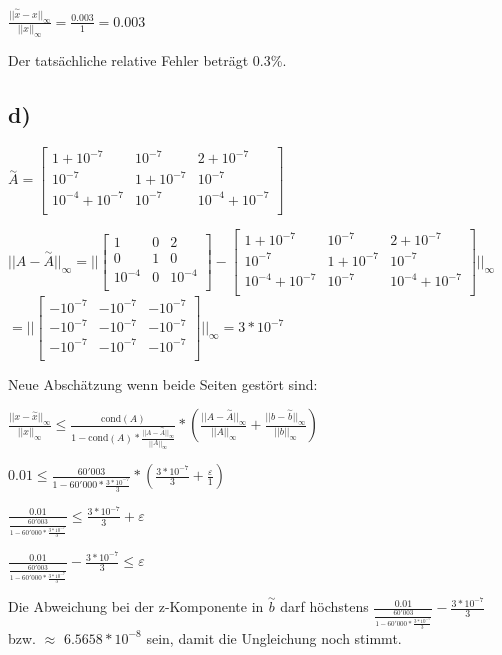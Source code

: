 \documentclass{article}
\begin{document}
\(\frac{||\overset{\sim}{x} - x||_\infty}{||x||_\infty} = \frac{0.003}{1} = 0.003\)

Der tatsächliche relative Fehler beträgt 0.3\%.

\subsection*{d)}

\(\overset{\sim}{A} = 
\begin{bmatrix} 
1 + 10^{-7} & 10^{-7} & 2 + 10^{-7} \\
10^{-7} & 1 + 10^{-7} & 10^{-7} \\
10^{-4} + 10^{-7} & 10^{-7} & 10^{-4} + 10^{-7} \\
\end{bmatrix}
\)

\(||A - \overset{\sim}{A}||_\infty = || 
\begin{bmatrix} 
1 & 0 & 2 \\
0 & 1 & 0 \\
10^{-4} & 0 & 10^{-4} \\
\end{bmatrix}
-
\begin{bmatrix} 
1 + 10^{-7} & 10^{-7} & 2 + 10^{-7} \\
10^{-7} & 1 + 10^{-7} & 10^{-7} \\
10^{-4} + 10^{-7} & 10^{-7} & 10^{-4} + 10^{-7} \\
\end{bmatrix}
||_\infty\)\\
\(
 =
||
\begin{bmatrix} 
-10^{-7} & -10^{-7} & -10^{-7} \\
-10^{-7} & -10^{-7} & -10^{-7} \\
-10^{-7} & -10^{-7} & -10^{-7} \\
\end{bmatrix}
||_\infty = 3 * 10^{-7}
\)

Neue Abschätzung wenn beide Seiten gestört sind:

\(\frac{||x - \overset{\sim}{x}||_\infty}{||x||_\infty} \leq \frac{\text{cond}(A)}{1-\text{cond}(A)*\frac{||A-\overset{\sim}{A}||_\infty}{||A||_\infty}} * (\frac{||A-\overset{\sim}{A}||_\infty}{||A||_\infty} + \frac{||b - \overset{\sim}{b}||_\infty}{||b||_\infty})\)

\(0.01 \leq \frac{60'003}{1-60'000*\frac{3 * 10^{-7}}{3}} * (\frac{3 * 10^{-7}}{3} + \frac{\varepsilon}{1})\)

\(\frac{0.01}{\frac{60'003}{1-60'000*\frac{3 * 10^{-7}}{3}}} \leq \frac{3 * 10^{-7}}{3} + \varepsilon\)

\(\frac{0.01}{\frac{60'003}{1-60'000*\frac{3 * 10^{-7}}{3}}} - \frac{3 * 10^{-7}}{3} \leq \varepsilon\)

Die Abweichung bei der z-Komponente in \(\overset{\sim}{b}\) darf höchstens \(\frac{0.01}{\frac{60'003}{1-60'000*\frac{3 * 10^{-7}}{3}}} - \frac{3 * 10^{-7}}{3}\) bzw. \(\approx\) \(6.5658*10^{-8}\) sein, damit die Ungleichung noch stimmt.
\end{document}
